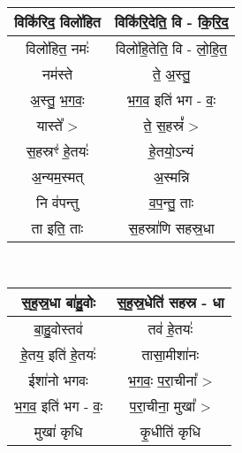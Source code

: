 {\centering
{\small {}} \\
\begin{longtable}{|c|c|}
\hline
विकि॑रिद॒ विलो॑हित              & विकि॑रि॒देति॒ वि - कि॒रि॒द॒\\
\hline
विलो॑हित॒ नमः॑                  & विलो॑हि॒तेति॒ वि - लो॒हि॒त॒\\
\hline
नम॑स्ते                         & ते॒ अ॒स्तु॒\\
\hline
अ॒स्तु॒ भ॒ग॒वः॒                     & भ॒ग॒व॒ इति॑ भग - वः॒\\
\hline
यास्ते᳚ >                       & ते॒ स॒हस्रं᳚ >\\
\hline
स॒हस्रꣳ॑ हे॒तयः॑                   & हे॒तयो॒ऽन्यं\\
\hline
अ॒न्यम॒स्मत्                      & अ॒स्मन्नि\\
\hline
नि व॑पन्तु                      & व॒प॒न्तु॒ ताः\\
\hline
ता इति॒ ताः                   & स॒हस्रा॑णि सहस्र॒धा\\
\hline
\end{longtable}
}
{\centering
{\small {}} \\
\begin{longtable}{|c|c|}
\hline
स॒ह॒स्र॒धा बा॑हु॒वोः                & स॒ह॒स्र॒धेति॑ सहस्र - धा\\
\hline
बा॒हु॒वोस्तव॑                     & तव॑ हे॒तयः॑\\
\hline
हे॒तय॒ इति॑ हे॒तयः॑                 & तासा॒मीशा॑नः\\
\hline
ईशा॑नो भगवः                   & भ॒ग॒वः॒ प॒रा॒चीना᳚ >\\
\hline
भ॒ग॒व॒ इति॑ भग - वः॒              & प॒रा॒चीना॒ मुखा᳚ >\\
\hline
मुखा॑ कृधि                      & कृ॒धीति॑ कृधि\\
\hline
\end{longtable}
}
